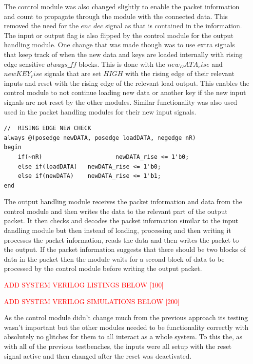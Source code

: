 \documentclass[12pt,twoside,a4paper]{report}
\begin{document}
	The control module was also changed slightly to enable the packet information and count to propagate through the module with the connected data. This removed the need for the $enc\_dec$ signal as that is contained in the information. The input or output flag is also flipped by the control module for the output handling module. One change that was made though was to use extra signals that keep track of when the new data and keys are loaded internally with rising edge sensitive $always\_ff$ blocks. This is done with the $new_DATA_rise$ and $newKEY_rise$ signals that are set $HIGH$ with the rising edge of their relevant inputs and reset with the rising edge of the relevant load output. This enables the control module to not continue loading new data or another key if the new input signals are not reset by the other modules. Similar functionality was also used used in the packet handling modules for their new input signals.

 	\begin{minipage}{\linewidth}
	\begin{lstlisting}[label={lst:new_rise},caption={The $always\_ff$ blocks used for risnig edge new data checks},style=SVStyle]
//	RISING EDGE NEW CHECK
always @(posedge newDATA, posedge loadDATA, negedge nR)
begin
	if(~nR)						newDATA_rise <= 1'b0;
	else if(loadDATA)	newDATA_rise <= 1'b0;
	else if(newDATA)	newDATA_rise <= 1'b1;
end
	\end{lstlisting}
	\end{minipage}
	
	The output handling module receives the packet information and data from the control module and then writes the data to the relevant part of the output packet. It then checks and decodes the packet information similar to the input dandling module but then instead of loading, processing and then writing it processes the packet information, reads the data and then writes the packet to the output. If the packet information suggests that there should be two blocks of data in the packet then the module waits for a second block of data to be processed by the control module before writing the output packet.
    
	\textcolor{red}{ADD SYSTEM VERILOG LISTINGS BELOW [100]}
    
	\textcolor{red}{ADD SYSTEM VERILOG SIMULATIONS BELOW [200]}
	
	As the control module didn't change much from the previous approach its testing wasn't important but the other modules needed to be functionality correctly with absolutely no glitches for them to all interact as a whole system. To this the, as with all of the previous testbenches, the inputs were all setup with the reset signal active and then changed after the reset was deactivated.
\end{document}
